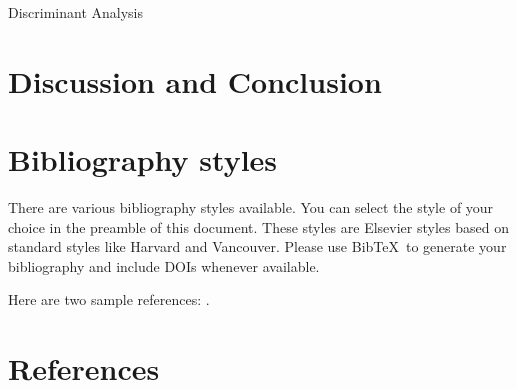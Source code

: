 \documentclass[review]{elsarticle}
\begin{document}
Discriminant Analysis 


\section{Discussion and Conclusion}

\section{Bibliography styles}

There are various bibliography styles available. You can select the style of your choice in the preamble of this document. These styles are Elsevier styles based on standard styles like Harvard and Vancouver. Please use Bib\TeX\ to generate your bibliography and include DOIs whenever available.

Here are two sample references: \cite{Feynman1963118,Dirac1953888}.

\section*{References}


\end{document}
